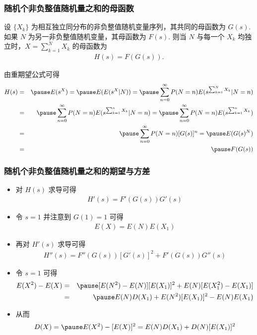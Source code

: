 \documentclass[Prob-All.tex]{subfiles}
\begin{document}
\begin{frame}

	\frametitle{随机个非负整值随机量之和的母函数}
	\begin{thm}
		设 $\{X_k\}$ 为相互独立同分布的非负整值随机变量序列，其共同的母函数为 $G (s)$. 如果 $N$ 为另一非负整值随机变量，其母函数为 $F (s)$. 则当 $N$ 与每一个 $X_k$ 均独立时，$X=\sum_{k=1}^NX_k$ 的母函数为
		\begin{eqnarray*}
			H(s)=F(G(s)).
		\end{eqnarray*}

	\end{thm}

	\pause
	\zheng 由重期望公式可得
	\begin{eqnarray*}
		H(s)&=&\pause E(s^X)=\pause E(E(s^X|N))=\pause\sum_{n=0}^\infty P(N=n) E(s^{\sum_{k=1}^NX_k}|N=n)\\
		&=&\pause\sum_{n=0}^\infty P(N=n) E(s^{\sum_{k=1}^nX_k}|N=n)=\pause\sum_{n=0}^\infty P(N=n) E(s^{\sum_{k=1}^nX_k})\\
		&=&\pause\sum_{n=0}^\infty P(N=n)[G(s)]^n=\pause E(G(s)^N)\\
		&=&\pause F(G(s))
	\end{eqnarray*}

\end{frame}

\begin{frame}
	\frametitle{随机个非负整值随机量之和的期望与方差}
	\begin{itemize}[<+-|alert@+>]
		\item 对 $H (s)$ 求导可得
		\begin{eqnarray*}
			H'(s)=F'(G(s))G'(s)
		\end{eqnarray*}
		\item 令 $s=1$ 并注意到 $G (1)=1$ 可得
		\begin{eqnarray*}
			E(X)=E(N)E(X_1)
		\end{eqnarray*}
		\item 再对 $H'(s)$ 求导可得
		\begin{eqnarray*}
			H''(s)=F''(G(s))[G'(s)]^2+F'(G(s))G''(s)
		\end{eqnarray*}
		\item 令 $s=1$ 可得
		\begin{eqnarray*}
			E(X^2)-E(X)  &=&\pause \mbox{[}E(N^2)-E(N)][E(X_1)]^2+E(N)[E(X_1^2)-E(X_1)]\\
			&=&\pause  E(N)D(X_1)+E(N^2)[E(X_1)]^2-E(N)E(X_1)
		\end{eqnarray*}
		\item 从而
		\begin{eqnarray*}
			D(X)=\pause E(X^2)-[E(X)]^2=E(N)D(X_1)+D(N)[E(X_1)]^2
		\end{eqnarray*}
	\end{itemize}
\end{frame}
\end{document}
